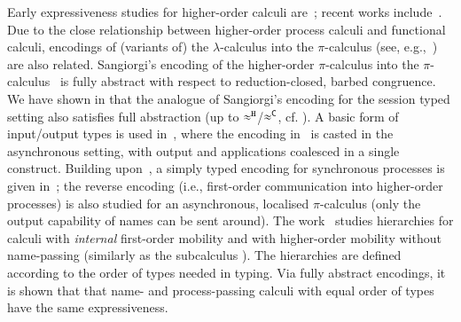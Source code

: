 \documentclass[preprint,11pt]{elsarticle}
\begin{document}
{Early expressiveness studies for higher-order calculi are~\cite{Tho90,SangiorgiD:expmpa}; 
recent works include~\cite{BundgaardHG06,DBLP:conf/icalp/LanesePSS10,DBLP:journals/iandc/LanesePSS11,XuActa2012,DBLP:conf/wsfm/XuYL13}.
Due to the close relationship between higher-order process calculi and functional calculi, 
encodings of (variants of) the $\lambda$-calculus into the $\pi$-calculus (see, e.g.,~\cite{San92,DBLP:journals/tcs/Fu99,DBLP:journals/iandc/YoshidaBH04,BHY,DBLP:conf/concur/SangiorgiX14}) are also related.
Sangiorgi's encoding of the higher-order $\pi$-calculus
into the  $\pi$-calculus~\cite{SangiorgiD:expmpa} 
is fully abstract with respect to reduction-closed, barbed congruence. 
We have shown in  that the analogue of Sangiorgi's encoding for the session typed setting also satisfies full abstraction (up to $\approx^\mathtt{H}$/$\approx^\mathtt{C}$, cf. ).
A basic form of input/output types is used in~\cite{DBLP:journals/tcs/Sangiorgi01}, where the encoding in~\cite{SangiorgiD:expmpa} is casted in the asynchronous setting, with output and applications coalesced in a single construct. Building upon~\cite{DBLP:journals/tcs/Sangiorgi01}, 
a simply typed encoding for synchronous processes is given in~\cite{SaWabook}; the reverse encoding (i.e.,  first-order communication into higher-order processes) is also studied  for an asynchronous, localised $\pi$-calculus (only the output capability of names can be sent around).
The work~\cite{San96int} studies hierarchies for calculi with \emph{internal} first-order mobility and 
with higher-order mobility without name-passing (similarly as the subcalculus \HO). 
The hierarchies are
defined according to the order of types needed in typing.
Via fully abstract encodings, it is shown that that name- and process-passing calculi with equal order of types have the same expressiveness.


}
\end{document}

